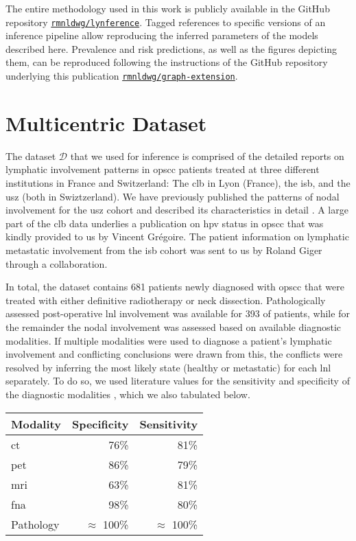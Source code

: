 \documentclass[twocolumn]{aastex631}
\begin{document}
The entire methodology used in this work is publicly available in the GitHub repository \href{https://github.com/rmnldwg/lynference}{\texttt{rmnldwg/lynference}}. Tagged references to specific versions of an inference pipeline allow reproducing the inferred parameters of the models described here. Prevalence and risk predictions, as well as the figures depicting them, can be reproduced following the instructions of the GitHub repository underlying this publication \href{https://github.com/rmnldwg/graph-extension}{\texttt{rmnldwg/graph-extension}}.

\section{Multicentric Dataset}
\label{sec:data}

The dataset $\boldsymbol{\mathcal{D}}$ that we used for inference is comprised of the detailed reports on lymphatic involvement patterns in \gls{opscc} patients treated at three different institutions in France and Switzerland: The \gls{clb} in Lyon (France), the \gls{isb}, and the \gls{usz} (both in Swiztzerland). We have previously published the patterns of nodal involvement for the \gls{usz} cohort \cite{ludwig_dataset_2022} and described its characteristics in detail \cite{ludwig_detailed_2022}. A large part of the \gls{clb} data underlies a publication on \gls{hpv} status in \gls{opscc} \cite{bauwens_prevalence_2021} that was kindly provided to us by Vincent Grégoire. The patient information on lymphatic metastatic involvement from the \gls{isb} cohort was sent to us by Roland Giger through a collaboration.

In total, the dataset contains 681 patients newly diagnosed with \gls{opscc} that were treated with either definitive radiotherapy or neck dissection. Pathologically assessed post-operative \gls{lnl} involvement was available for 393 of patients, while for the remainder the nodal involvement was assessed based on available diagnostic modalities. If multiple modalities were used to diagnose a patient's lymphatic involvement and conflicting conclusions were drawn from this, the conflicts were resolved by inferring the most likely state (healthy or metastatic) for each \gls{lnl} separately. To do so, we used literature values for the sensitivity and specificity of the diagnostic modalities \cite{de_bondt_detection_2007,kyzas_18f-fluorodeoxyglucose_2008}, which we also tabulated below.

\noindent
\begin{center}
    \begin{tabular}{|l|rr|}
        \hline
        \textbf{Modality} & \textbf{Specificity} & \textbf{Sensitivity} \\
        \hline
        \acrshort{ct} & 76\% & 81\% \\
        \acrshort{pet} & 86\% & 79\% \\
        \gls{mri} & 63\% & 81\% \\
        \acrshort{fna} & 98\% & 80\% \\
        Pathology & $\approx$ 100\% & $\approx$ 100\% \\
        \hline
    \end{tabular}
\end{center}
\end{document}
